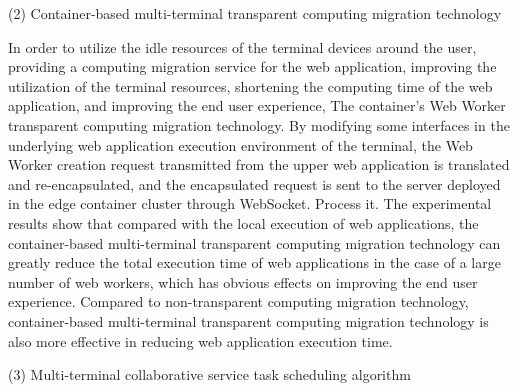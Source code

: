 (2) Container-based multi-terminal transparent computing migration technology

In order to utilize the idle resources of the terminal devices around the user, providing a computing migration service for the web application, improving the utilization of the terminal resources, shortening the computing time of the web application, and improving the end user experience, The container's Web Worker transparent computing migration technology. By modifying some interfaces in the underlying web application execution environment of the terminal, the Web Worker creation request transmitted from the upper web application is translated and re-encapsulated, and the encapsulated request is sent to the server deployed in the edge container cluster through WebSocket. Process it. The experimental results show that compared with the local execution of web applications, the container-based multi-terminal transparent computing migration technology can greatly reduce the total execution time of web applications in the case of a large number of web workers, which has obvious effects on improving the end user experience. Compared to non-transparent computing migration technology, container-based multi-terminal transparent computing migration technology is also more effective in reducing web application execution time.

(3) Multi-terminal collaborative service task scheduling algorithm

